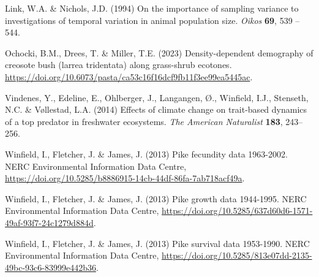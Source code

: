 \documentclass[12pt]{article}
\begin{document}
\begin{spacing}{1.35}
\begin{thebibliography}{62}
Link, W.A. \& Nichols, J.D. (1994) On the importance of sampling variance to
  investigations of temporal variation in animal population size. \emph{Oikos}
  \textbf{69}, 539 -- 544.

Ochocki, B.M., Drees, T. \& Miller, T.E. (2023) Density-dependent demography of
  creosote bush (larrea tridentata) along grass-shrub ecotones.
  \url{https://doi.org/10.6073/pasta/ca53c16f16dcf9fb11f3ee99ea5445ac}.

Vindenes, Y., Edeline, E., Ohlberger, J., Langangen, {\O}., Winfield, I.J.,
  Stenseth, N.C. \& V{\o}llestad, L.A. (2014) Effects of climate change on
  trait-based dynamics of a top predator in freshwater ecosystems. \emph{The
  American Naturalist} \textbf{183}, 243--256.

Winfield, I., Fletcher, J. \& James, J. (2013{}) Pike fecundity
  data 1963-2002. NERC Environmental Information Data Centre,
  \url{https://doi.org/10.5285/b8886915-14cb-44df-86fa-7ab718acf49a}.

Winfield, I., Fletcher, J. \& James, J. (2013{}) Pike growth data
  1944-1995. NERC Environmental Information Data Centre, \url{
  https://doi.org/10.5285/637d60d6-1571-49af-93f7-24c1279d884d}.

Winfield, I., Fletcher, J. \& James, J. (2013{}) Pike survival data
  1953-1990. NERC Environmental Information Data Centre,
  \url{https://doi.org/10.5285/813e07dd-2135-49bc-93c6-83999e442b36}.

\end{thebibliography}









\end{spacing}
\end{document}
